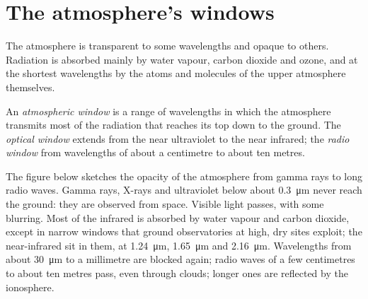 \section{The atmosphere's windows}

The atmosphere is transparent to some wavelengths and opaque to others.
Radiation is absorbed mainly by water vapour, carbon dioxide and ozone, and
at the shortest wavelengths by the atoms and molecules of the upper
atmosphere themselves.

\begin{definition}\label{def:b1:observing-the-sky:window}
An \emph{atmospheric window} is a range of
wavelengths in which the atmosphere transmits most of the radiation that
reaches its top down to the ground. The \emph{optical window} extends from
the near ultraviolet to the near infrared; the \emph{radio window} from
wavelengths of about a centimetre to about ten metres.
\end{definition}

The figure below sketches the opacity of the
atmosphere from gamma rays to long radio waves. Gamma rays, X-rays and
ultraviolet below about \qty{0.3}{\micro\metre} never reach the ground:
they are observed from space. Visible light passes, with some blurring. Most
of the infrared is absorbed by water vapour and carbon dioxide, except in
narrow windows that ground observatories at high, dry sites exploit; the
near-infrared  sit in them, at \qty{1.24}{\micro\metre},
\qty{1.65}{\micro\metre} and \qty{2.16}{\micro\metre}. Wavelengths from about
\qty{30}{\micro\metre} to a millimetre are blocked again; radio waves of a
few centimetres to about ten metres pass, even through clouds; longer ones
are reflected by the ionosphere.


